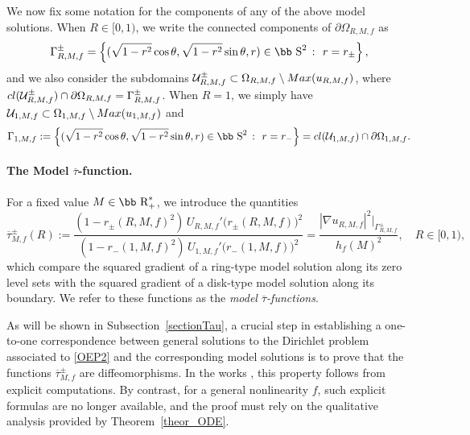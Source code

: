 \documentclass[11pt]{article}
\def\r{\hbox{\bb R}}
\def\s{\hbox{\bb S}}
\newcommand{\U}{\mathcal{U}}
\newcommand{\abs}[1]{\left\vert #1 \right\vert}
\newcommand{\set}[1]{\left\{#1\right\}}
\numberwithin{equation} {section}
\begin{document}
We now fix some notation for the components of any of the above model solutions. When $R \in [0, 1)$, we write the connected components of $\partial \Omega_{R,M,f}$ as 
\begin{equation}\label{boundaryComponent}
\Gamma_{R,M,f}^{\pm} = \set{(\sqrt{1-r^2} \cos \theta , \sqrt{1-r^2} \sin \theta ,r) \in \s^2 ~\colon~ r =r_\pm}, 
\end{equation}
and we also consider the subdomains $\U_{R,M,f}^{\pm} \subset \Omega_{R,M,f} \setminus \textup{Max} (u_{R,M,f})$, where $\textup{cl} (\U_{R,M,f}^{\pm}) \cap \partial \Omega_{R,M,f} = \Gamma_{R,M,f}^{\pm}$. When $R=1$, we simply have $\U_{1,M,f} \subset \Omega_{1,M,f} \setminus \textup{Max} (u_{1,M,f})$ and
$$ \Gamma_{1,M,f} :=\set{(\sqrt{1-r^2} \cos \theta , \sqrt{1-r^2} \sin \theta ,r) \in \s^2 ~\colon~ r =r_-} = \textup{cl} (\U_{1,M,f}) \cap \partial \Omega_{1,M,f}.$$

\paragraph{The Model $\overline{\tau}$-function.} 
For a fixed value $M \in \r_+^*$, we introduce the quantities
\begin{equation}\label{tauModelSolutions}
	\overline{\tau}_{M,f}^\pm (R)
	:= \frac{(1-r_{\pm} (R,M,f)^2)\, U_{R,M,f}' \big(r_{\pm} (R,M,f)\big)^2}
	{(1-r_{-} (1,M,f)^2)\, U_{1,M,f}' \big(r_{-} (1,M,f)\big)^2}
	= \frac{\abs{\nabla u_{R,M,f}}^2 \big|_{\Gamma_{R,M,f}^{\pm}}}{h_f(M)^2},
	\quad R \in [0,1),
\end{equation}
which compare the squared gradient of a ring-type model solution along its zero level sets with the squared gradient of a disk-type model solution along its boundary.
We refer to these functions as the \textit{model $\overline{\tau}$-functions}.

As will be shown in Subsection~\ref{sectionTau}, a crucial step in establishing a one-to-one correspondence between general solutions to the Dirichlet problem associated to \eqref{OEP2} and the corresponding model solutions is to prove that the functions $\overline{\tau}_{M,f}^{\pm}$ are diffeomorphisms.
In the works \cite{ABM,EMa}, this property follows from explicit computations.
By contrast, for a general nonlinearity $f$, such explicit formulas are no longer available, and the proof must rely on the qualitative analysis provided by Theorem~\ref{theor_ODE}.
\end{document}
